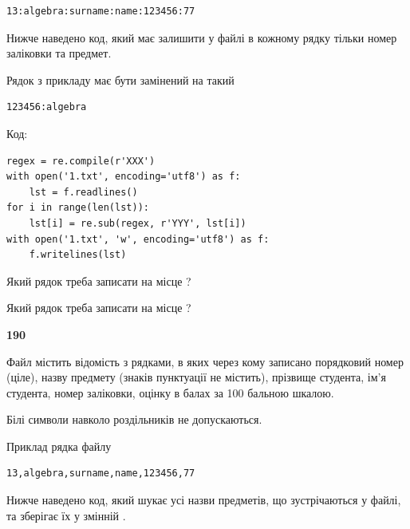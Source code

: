\begin{verbatim}
13:algebra:surname:name:123456:77
\end{verbatim}


Нижче наведено код, який має залишити у файлі в кожному рядку тільки номер заліковки та предмет.

Рядок з прикладу має бути замінений на такий



\begin{verbatim}
123456:algebra
\end{verbatim}




Код:



\begin{verbatim}
regex = re.compile(r'XXX')
with open('1.txt', encoding='utf8') as f:
    lst = f.readlines()
for i in range(len(lst)):
    lst[i] = re.sub(regex, r'YYY', lst[i])
with open('1.txt', 'w', encoding='utf8') as f:
    f.writelines(lst)
\end{verbatim}









Який рядок треба записати на місце  ?\par
\vspace{5mm}


Який рядок треба записати на місце  ?\par


\newpage

{\begin {center}\textbf{ 190}\end {center}}\par
Файл  містить відомість з рядками, в яких через кому записано поряд\-ковий номер (ціле), назву предмету (знаків пунктуації не містить), прізвище студента, ім'я студента, номер заліковки, оцінку в балах за 100 бальною шкалою.

Білі символи навколо роздільників не допускаються.

Приклад рядка файлу



\begin{verbatim}
13,algebra,surname,name,123456,77
\end{verbatim}


Нижче наведено код, який шукає усі назви предметів, що зустрічаються у файлі, та зберігає їх у змінній .



